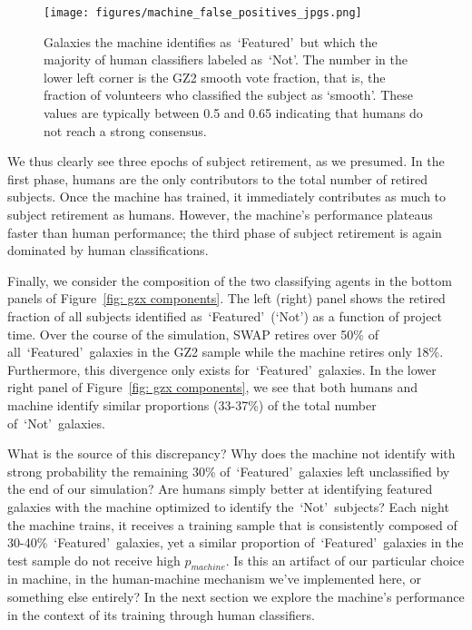 \documentclass[twocolumn]{aastex6}
\newcommand{\feat}{`Featured'}
\newcommand{\notfeat}{`Not'}
\begin{document}
\begin{figure}[t!]
\centering
\texttt{[image: figures/machine\_false\_positives\_jpgs.png]}
\caption{Galaxies the machine identifies as~\feat~but which the majority of human classifiers labeled as~\notfeat. The number in the lower left corner is the GZ2 smooth vote fraction, that is, the fraction of volunteers who classified the subject as `smooth'. These values are typically between 0.5 and 0.65 indicating that humans do not reach a strong consensus.  \label{fig: machine false pos}}
\end{figure}

We thus clearly see three epochs of subject retirement, as we presumed.
In the first phase, humans are the only contributors to the total number of retired subjects.  
Once the machine has trained, it immediately contributes as much to subject retirement as humans.
However, the machine's performance plateaus faster than human performance;  the third 
phase of subject retirement is again dominated by human classifications.

Finally, we consider the composition of the two classifying agents in the bottom 
panels of Figure~\ref{fig: gzx components}. The left (right) panel shows the 
retired fraction of all subjects identified as~\feat~(\notfeat) as a function of project time. 
Over the course of the simulation, SWAP retires over 50\% of all~\feat~galaxies 
in the GZ2 sample while the machine retires only 18\%. Furthermore, this divergence 
only exists for~\feat~galaxies. In the lower right panel of  Figure~\ref{fig: gzx components}, 
we see that both humans and machine identify similar proportions (33-37\%) of 
the total number of~\notfeat~galaxies. 

What is the source of this discrepancy? 
Why does the machine not identify with strong probability the remaining 30\% 
of~\feat~galaxies left unclassified by the end of our simulation? 
Are humans simply better at identifying featured galaxies with the machine optimized
to identify the~\notfeat~subjects? 
Each night the machine trains, it receives a training sample that is consistently composed of 30-40\%~\feat~galaxies, yet a similar proportion of~\feat~galaxies in the test sample
do not receive high $p_{machine}$.
Is this an artifact of our particular choice in machine, in the human-machine mechanism we've implemented here, or something else entirely?
In the next section we explore the machine's performance in the context of its 
training through human classifiers. 
\end{document}
